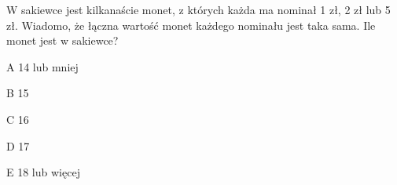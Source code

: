 \begin{tresc}
W sakiewce jest kilkanaście monet, z których każda ma nominał 1 zł, 2 zł lub 5 zł. Wiadomo, że łączna wartość monet każdego nominału jest taka sama. Ile monet jest w sakiewce?
\end{tresc}
\begin{wariant}{A} 14 lub mniej \end{wariant}
\begin{wariant}{B} 15 \end{wariant}
\begin{wariant}{C} 16 \end{wariant}
\begin{wariant}{D} 17 \end{wariant}
\begin{wariant}{E} 18 lub więcej \end{wariant}
